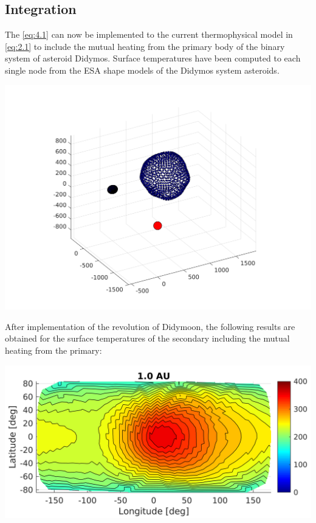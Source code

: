\subsection{Integration}
The \autoref{eq:4.1} can now be implemented to the current thermophysical model in \autoref{eq:2.1} to include the mutual heating from the primary body of the binary system of asteroid Didymos. Surface temperatures have been computed to each single node from the ESA shape models of the Didymos system asteroids.
\begin{center}
    \includegraphics[width=\linewidth]{rsc/mutual_model.png}
    \label{fig:4.2}
\end{center}
After implementation of the revolution of Didymoon, the following results are obtained for the surface temperatures of the secondary including the mutual heating from the primary:
\begin{center}
    \includegraphics[width=\linewidth]{rsc/mutual.png}
    \label{fig:4.2}
\end{center}
